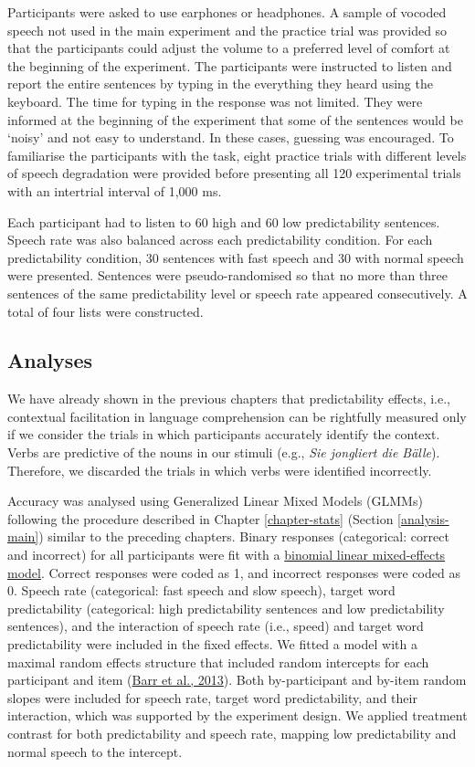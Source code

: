 \documentclass[a4paper, nobind]{templates/ociamthesis}
\begin{document}
Participants were asked to use earphones or headphones.
A sample of vocoded speech not used in the main experiment and the practice trial was provided so that the participants could adjust the volume to a preferred level of comfort at the beginning of the experiment.
The participants were instructed to listen and report the entire sentences by typing in the everything they heard using the keyboard.
The time for typing in the response was not limited.
They were informed at the beginning of the experiment that some of the sentences would be `noisy' and not easy to understand.
In these cases, guessing was encouraged.
To familiarise the participants with the task, eight practice trials with different levels of speech degradation were provided before presenting all 120 experimental trials with an intertrial interval of 1,000 ms.

Each participant had to listen to 60 high and 60 low predictability sentences.
Speech rate was also balanced across each predictability condition.
For each predictability condition, 30 sentences with fast speech and 30 with normal speech were presented.
Sentences were pseudo-randomised so that no more than three sentences of the same predictability level or speech rate appeared consecutively.
A total of four lists were constructed.

\hypertarget{analyses-3}{%
\subsection{Analyses}\label{analyses-3}}

We have already shown in the previous chapters that predictability effects, i.e., contextual facilitation in language comprehension can be rightfully measured only if we consider the trials in which participants accurately identify the context.
Verbs are predictive of the nouns in our stimuli (e.g., \emph{Sie jongliert die Bälle}).
Therefore, we discarded the trials in which verbs were identified incorrectly.

Accuracy was analysed using Generalized Linear Mixed Models (GLMMs) following the procedure described in Chapter \ref{chapter-stats} (Section \ref{analysis-main}) similar to the preceding chapters.
Binary responses (categorical: correct and incorrect) for all participants were fit with a \protect\hyperlink{binomial-logistic-mixed-effects-model}{binomial linear mixed-effects model}.
Correct responses were coded as 1, and incorrect responses were coded as 0.
Speech rate (categorical: fast speech and slow speech), target word predictability (categorical: high predictability sentences and low predictability sentences), and the interaction of speech rate (i.e., speed) and target word predictability were included in the fixed effects.
We fitted a model with a maximal random effects structure that included random intercepts for each participant and item (\protect\hyperlink{ref-Barr2013}{Barr et al., 2013}).
Both by-participant and by-item random slopes were included for speech rate, target word predictability, and their interaction,
which was supported by the experiment design.
We applied treatment contrast for both predictability and speech rate, mapping low predictability and normal speech to the intercept.
\end{document}
